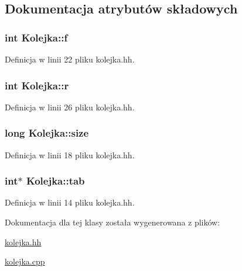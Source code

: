 \subsection{Dokumentacja atrybutów składowych}
\hypertarget{class_kolejka_ae66597dc9eb1fcc210b075f8aa7ff77f}{
\subsubsection[{f}]{\setlength{\rightskip}{0pt plus 5cm}int Kolejka\-::f\hspace{0.3cm}{\ttfamily [private]}}}\label{class_kolejka_ae66597dc9eb1fcc210b075f8aa7ff77f}


Definicja w linii 22 pliku kolejka.\-hh.

\hypertarget{class_kolejka_ae16213a5b751800eb48da6bede435ad0}{
\subsubsection[{r}]{\setlength{\rightskip}{0pt plus 5cm}int Kolejka\-::r\hspace{0.3cm}{\ttfamily [private]}}}\label{class_kolejka_ae16213a5b751800eb48da6bede435ad0}


Definicja w linii 26 pliku kolejka.\-hh.

\hypertarget{class_kolejka_a84898848de8e77a76a6f2e4a7393b4bb}{
\subsubsection[{size}]{\setlength{\rightskip}{0pt plus 5cm}long Kolejka\-::size\hspace{0.3cm}{\ttfamily [private]}}}\label{class_kolejka_a84898848de8e77a76a6f2e4a7393b4bb}


Definicja w linii 18 pliku kolejka.\-hh.

\hypertarget{class_kolejka_a49e444e7bd7b91a78bc2a46426b73128}{
\subsubsection[{tab}]{\setlength{\rightskip}{0pt plus 5cm}int$\ast$ Kolejka\-::tab\hspace{0.3cm}{\ttfamily [private]}}}\label{class_kolejka_a49e444e7bd7b91a78bc2a46426b73128}


Definicja w linii 14 pliku kolejka.\-hh.



Dokumentacja dla tej klasy została wygenerowana z plików\-:\begin{DoxyCompactItemize}
\item 
\hyperlink{kolejka_8hh}{kolejka.\-hh}\item 
\hyperlink{kolejka_8cpp}{kolejka.\-cpp}\end{DoxyCompactItemize}
